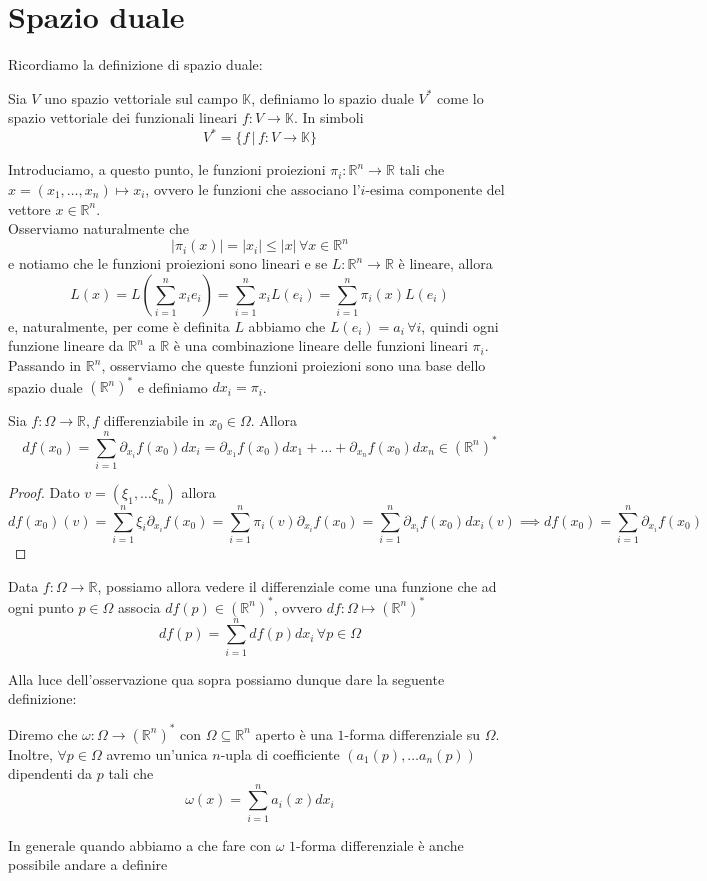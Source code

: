 \documentclass[openany]{book}
\begin{document}
\section{Spazio duale}
Ricordiamo la definizione di spazio duale:
\begin{definition}
Sia $V$ uno spazio vettoriale sul campo $\mathbb{K}$, definiamo lo spazio duale $V^{*}$ come lo spazio vettoriale dei funzionali lineari $f: V \to \mathbb{K}$. In simboli
$$
V^{*} = \{f \, | \, f: V \to \mathbb{K} \}
$$
\end{definition}
\noindent Introduciamo, a questo punto, le funzioni proiezioni $\pi_i: \mathbb{R}^n \to \mathbb{R}$ tali che $x = (x_1, \ldots, x_n) \mapsto x_i$, ovvero le funzioni che associano l'$i$-esima componente del vettore $x \in \mathbb{R}^n$. \\
Osserviamo naturalmente che
$$
|\pi_i(x)| = |x_i| \leq |x| \, \forall x \in \mathbb{R}^n
$$ 
e notiamo che le funzioni proiezioni sono lineari e se $L: \mathbb{R}^n \to \mathbb{R}$ è lineare, allora
$$
L(x) = L(\sum_{i=1}^n x_i e_i) = \sum_{i=1}^n x_i L(e_i) = \sum_{i=1}^n \pi_i(x) L(e_i)
$$
e, naturalmente, per come è definita $L$ abbiamo che $L(e_i) = a_i \, \forall i$, quindi ogni funzione lineare da $\mathbb{R}^n$ a $\mathbb{R}$ è una combinazione lineare delle funzioni lineari $\pi_i$. \\
Passando in $\mathbb{R}^n$, osserviamo che queste funzioni proiezioni sono una base dello spazio duale $(\mathbb{R}^n)^{*}$ e definiamo $dx_i = \pi_i$. \\
\begin{prop}
Sia $f: \Omega \to \mathbb{R}, f$ differenziabile in $x_0 \in \Omega$. Allora
$$
df(x_0) = \sum_{i=1}^n \partial_{x_i} f(x_0)dx_i = \partial_{x_1} f(x_0)dx_1 + \ldots + \partial_{x_n} f(x_0)dx_n \in (\mathbb{R}^n)^{*}
$$
\end{prop}
\begin{proof}
Dato $v=(\xi_1, \ldots \xi_n)$ allora
$$
df(x_0)(v) = \sum_{i=1}^n \xi_i \partial_{x_i} f(x_0) = \sum_{i=1}^n \pi_i(v) \partial_{x_i} f(x_0) = \sum_{i=1}^n \partial_{x_i} f(x_0) dx_i(v) \implies df(x_0) = \sum_{i=1}^n \partial_{x_i} f(x_0)
$$
\end{proof}
\begin{remark}
Data $f: \Omega \to \mathbb{R}$, possiamo allora vedere il differenziale come una funzione che ad ogni punto $p \in \Omega$ associa $df(p) \in (\mathbb{R}^n)^{*}$, ovvero $df: \Omega \mapsto (\mathbb{R}^n)^{*}$
$$
df(p) = \sum_{i=1}^n df(p)dx_i \, \forall p \in \Omega
$$
\end{remark}
Alla luce dell'osservazione qua sopra possiamo dunque dare la seguente definizione:
\begin{definition}
Diremo che $\omega: \Omega \to (\mathbb{R}^n)^{*}$ con $\Omega \subseteq \mathbb{R}^n$ aperto è una $1$-forma differenziale su $\Omega$. Inoltre, $\forall p \in \Omega$ avremo un'unica $n$-upla di coefficiente $(a_1(p), \ldots a_n(p))$ dipendenti da $p$ tali che
$$
\omega(x) = \sum_{i=1}^n a_i(x)dx_i
$$
\end{definition}
\begin{remark}
In generale quando abbiamo a che fare con $\omega$ $1$-forma differenziale è anche possibile andare a definire
\end{remark}
\end{document}
